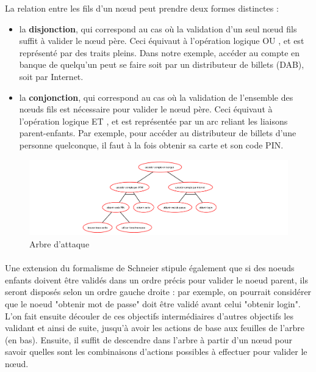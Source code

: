         La relation entre les fils d'un nœud peut prendre deux formes distinctes :
        \begin{itemize}
            \item la {\bf disjonction}, qui correspond au cas où la validation d'un seul nœud fils suffit à valider le nœud père. Ceci équivaut à l'opération logique \og OU \fg{}, et est représenté par des traits pleins. Dans notre exemple, accéder au compte en banque de quelqu'un peut se faire soit par un distributeur de billets (DAB), soit par Internet.
            
            \item la {\bf conjonction}, qui correspond au cas où la validation de l'ensemble des nœuds fils est nécessaire pour valider le nœud père. Ceci équivaut à l'opération logique \og ET \fg{}, et est représentée par un arc reliant les liaisons parent-enfants. Par exemple, pour accéder au distributeur de billets d'une personne quelconque, il faut à la fois obtenir sa carte et son code PIN.
        \end{itemize} 
	
		\begin{figure}[h]
	        \centering
	        \includegraphics[width=1\textwidth]{figure/exemple1_rapport.pdf}
	        \caption{Arbre d'attaque}
	        \label{fig:arbre_exemple_1}
        \end{figure}

	\paragraph{}

        Une extension du formalisme de Schneier stipule également que si des noeuds enfants doivent être validés dans un ordre précis pour valider le noeud parent, ils seront disposés selon un ordre gauche droite : par exemple, on pourrait considérer que le noeud "obtenir mot de passe" doit être validé avant celui "obtenir login". L'on fait ensuite découler de ces objectifs intermédiaires d'autres objectifs les validant et ainsi de suite, jusqu'à avoir les actions de base aux feuilles de l'arbre (en bas). Ensuite, il suffit de descendre dans l'arbre à partir d'un nœud pour savoir quelles sont les combinaisons d'actions possibles à effectuer pour valider le nœud.

